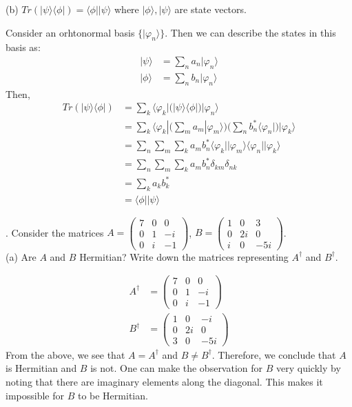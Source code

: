 \documentclass[a4paper, 11pt]{article}
\newcommand{\ket}[1]{|#1\rangle}
\newcommand{\bra}[1]{\langle #1 |}
\newenvironment{solution}{%
	\begin{list}{}{%
			\setlength{\topsep}{0pt}%
			\setlength{\leftmargin}{1.5cm}%
			\setlength{\rightmargin}{1.5cm}%
			\setlength{\listparindent}{\parindent}%
			\setlength{\itemindent}{\parindent}%
			\setlength{\parsep}{\parskip}%
	}%
	\item[]}{\end{list}}
\begin{document}
\noindent (b) $Tr(\ket{\psi}\bra{\phi}) = \bra{\phi}\ket{\psi}$ where $\ket{\phi}, \ket{\psi}$ are state vectors. \\
	\begin{solution}
		\noindent Consider an orhtonormal basis $\{\ket{\varphi_n}\}$. Then we can describe the states in this basis as: 
			\begin{align*}
				\ket{\psi} &= \sum_n a_n\ket{\varphi_n} \\ 
				\ket{\phi} &= \sum_n b_n\ket{\varphi_n} 
			\end{align*}
		Then, 
			\begin{align*}
				Tr(\ket{\psi}\bra{\phi}) &= \sum_k \bra{\varphi_k}\Big(\ket{\psi}\bra{\phi}\Big)\ket{\varphi_n} \\ 
				&= \sum_k\bra{\varphi_k}\Big(\sum_m a_m\ket{\varphi_m}\Big)\Big(\sum_n b_n^* \bra{\varphi_n}\Big)\ket{\varphi_k} \\ 
				&= \sum_n \sum_m \sum_k a_mb_n^* \bra{\varphi_k}\ket{\varphi_m}\bra{\varphi_n}\ket{\varphi_k} \\ 
				&= \sum_n \sum_m \sum_k a_m b_n^* \delta_{km} \delta_{nk} \\ 
				&= \sum_k a_k b_k^* \\ 
				&= \bra{\phi}\ket{\psi}
			\end{align*}
	\end{solution}

. Consider the matrices $A = \begin{pmatrix}7 & 0 & 0\\ 0 & 1 & -i \\ 0 & i & -1\end{pmatrix}$, $B = \begin{pmatrix}1 & 0 & 3 \\ 0 & 2i & 0 \\ i & 0 & -5i\end{pmatrix}$. \\ 

\noindent(a) Are $A$ and $B$ Hermitian? Write down the matrices representing $A^\dagger$ and $B^\dagger$. 
	\begin{solution}
		\begin{align*}
			A^\dagger &= \begin{pmatrix}7 & 0 & 0 \\ 0 & 1 & -i \\ 0 & i & -1\end{pmatrix} \\
			B^\dagger &= \begin{pmatrix}1 & 0 & -i \\ 0 & 2i & 0 \\ 3 & 0 & -5i\end{pmatrix}
		\end{align*}
		From the above, we see that $A=A^\dagger$ and $B\neq B^\dagger$. Therefore, we conclude that $A$ is Hermitian and $B$ is not. One can make the observation for $B$ very quickly by noting that there are imaginary elements along the diagonal. This makes it impossible for $B$ to be Hermitian. \\
	\end{solution} 
\end{document}
